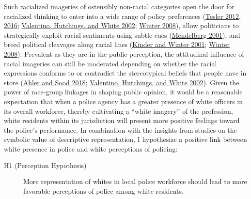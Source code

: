 \documentclass[
  12pt,
]{article}
\begin{document}
Such racialized imageries of ostensibly non-racial categories open the
door for racialized thinking to enter into a wide range of policy
preferences (\protect\hyperlink{ref-tesler2012}{Tesler 2012},
\protect\hyperlink{ref-tesler2016}{2016};
\protect\hyperlink{ref-valentino2002}{Valentino, Hutchings, and White
2002}; \protect\hyperlink{ref-winter2008}{Winter 2008}), allow
politicians to strategically exploit racial sentiments using subtle cues
(\protect\hyperlink{ref-mendelberg2001}{Mendelberg 2001}), and breed
political cleavages along racial lines
(\protect\hyperlink{ref-kinder2001}{Kinder and Winter 2001};
\protect\hyperlink{ref-winter2008}{Winter 2008}). Prevalent as they are
in the public perception, the attitudinal influence of racial imageries
can still be moderated depending on whether the racial expressions
conforms to or contradict the stereotypical beliefs that people have in
store (\protect\hyperlink{ref-ahler2018}{Ahler and Sood 2018};
\protect\hyperlink{ref-valentino2002}{Valentino, Hutchings, and White
2002}). Given the power of race-group linkages in shaping public
opinion, it would be a reasonable expectation that when a police agency
has a greater presence of white officers in its overall workforce,
thereby cultivating a ``white imagery'' of the profession, white
residents within its jurisdiction will present more positive feelings
toward the police's performance. In combination with the insights from
studies on the symbolic value of descriptive representation, I
hypothesize a positive link between white presence in police and white
perceptions of policing:

\begin{description}
\item[H1 (Perception Hypothesis)]
More representation of whites in local police workforce should lead to
more favorable perceptions of police among white residents.
\end{description}
\end{document}
